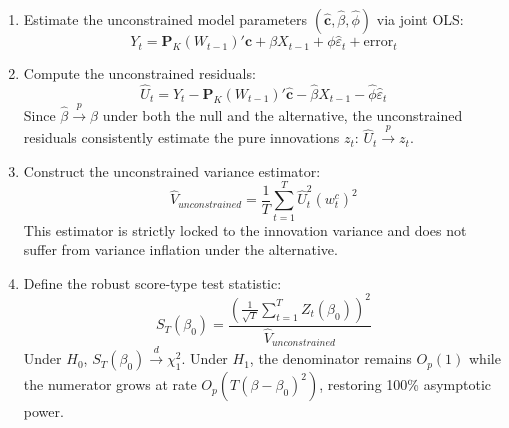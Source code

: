\documentclass[12pt]{article}
\begin{document}
\begin{enumerate}
    \item Estimate the unconstrained model parameters $(\widehat{\bm{c}}, \widehat{\beta}, \widehat{\phi})$ via joint OLS:
    \begin{equation}
        Y_t = \bm{P}_K(W_{t-1})'\bm{c} + \beta X_{t-1} + \phi \widehat{\varepsilon}_t + \text{error}_t
    \end{equation}
    \item Compute the unconstrained residuals:
    \begin{equation}
        \widehat{U}_t = Y_t - \bm{P}_K(W_{t-1})'\widehat{\bm{c}} - \widehat{\beta} X_{t-1} - \widehat{\phi} \widehat{\varepsilon}_t
    \end{equation}
    Since $\widehat{\beta} \xrightarrow{p} \beta$ under both the null and the alternative, the unconstrained residuals consistently estimate the pure innovations $z_t$: $\widehat{U}_t \xrightarrow{p} z_t$.
    \item Construct the unconstrained variance estimator:
    \begin{equation}
        \widehat{V}_{unconstrained} = \frac{1}{T} \sum_{t=1}^T \widehat{U}_t^2 (w^c_t)^2
    \end{equation}
    This estimator is strictly locked to the innovation variance and does not suffer from variance inflation under the alternative.
    \item Define the robust score-type test statistic:
    \begin{equation}
        S_T(\beta_0) = \frac{\left( \frac{1}{\sqrt{T}} \sum_{t=1}^T Z_t(\beta_0) \right)^2}{\widehat{V}_{unconstrained}}
    \end{equation}
    Under $H_0$, $S_T(\beta_0) \xrightarrow{d} \chi^2_1$. Under $H_1$, the denominator remains $O_p(1)$ while the numerator grows at rate $O_p(T (\beta - \beta_0)^2)$, restoring 100\% asymptotic power.
\end{enumerate}
\end{document}
